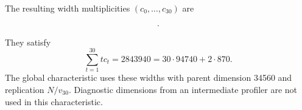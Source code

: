 The resulting width multiplicities $(c_0,\ldots,c_{30})$ are
\begin{small}\begin{align*}
[&0,732995,44182,51426,16384,25890,12459,27850,9777,17365,\\
 &7240,17013,5820,11236,4259,9880,3026,6497,1943,4817,\\
 &1082,3171,549,1880,103,1292,0,756,30,0,30].
\end{align*}\end{small}
They satisfy
\[
 \sum_{t=1}^{30}tc_t=2843940=30\cdot94740+2\cdot870.
\]
The global characteristic uses these widths with parent dimension
34560 and replication $N/v_{30}$. Diagnostic dimensions from an
intermediate profiler are not used in this characteristic.
